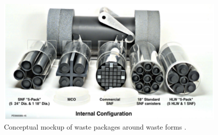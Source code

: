 \begin{figure}[htbp!]
  \begin{center}
    \includegraphics[width=0.7\textheight]{packages_ineel.eps}
  \end{center}
  \caption{Conceptual mockup of waste packages around waste forms 
    \cite{bridges_standardized_2001}.}
  \label{fig:packages}
\end{figure}
